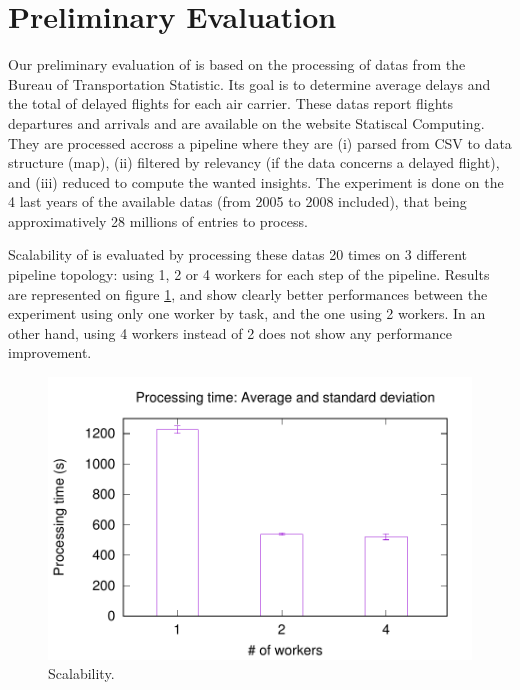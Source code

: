 \section{Preliminary Evaluation}
\label{sec:eval}


Our preliminary evaluation of \SYS is based on the processing of datas from the Bureau of Transportation Statistic\cite{rita:bts}.
Its goal is to determine average delays and the total of delayed flights for each air carrier.
These datas report flights departures and arrivals\cite{rita:bts} and are available on the website Statiscal Computing\cite{statistical_computing:data}.
They are processed accross a pipeline where they are (i) parsed from CSV to data structure (map), (ii) filtered by relevancy (if the data concerns a delayed flight), and (iii) reduced to compute the wanted insights.
The experiment is done on the 4 last years of the available datas (from 2005 to 2008 included), that being approximatively 28 millions of entries to process.

Scalability of \SYS is evaluated by processing these datas 20 times on 3 different pipeline topology: using 1, 2 or 4 workers for each step of the pipeline.
Results are represented on figure \ref{fig:scalability}, and show clearly better performances between the experiment using only one worker by task, and the one using 2 workers.
In an other hand, using 4 workers instead of 2 does not show any performance improvement.

\begin{figure}[t!]
  \centering
  \includegraphics[width=.99\linewidth]{images/avg_stdev_4_streams}
  \caption{Scalability.}
  \label{fig:scalability}
\end{figure}

